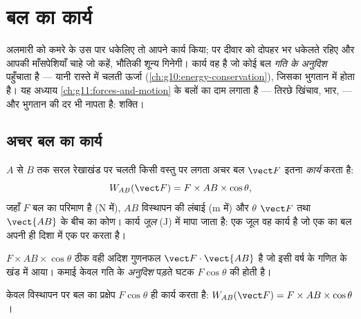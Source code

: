 \chapter{बल का कार्य}\label{ch:g11:work-of-force}

अलमारी को कमरे के उस पार धकेलिए तो आपने कार्य किया; पर दीवार को दोपहर भर
धकेलते रहिए और आपकी माँसपेशियाँ चाहे जो कहें, भौतिकी शून्य गिनेगी।
कार्य वह है जो कोई बल \emph{गति के अनुदिश} पहुँचाता है ---
यानी रास्ते में चलती ऊर्जा (\cref{ch:g10:energy-conservation}), जिसका भुगतान  में होता
है। यह अध्याय \cref{ch:g11:forces-and-motion} के बलों का दाम लगाता है --- तिरछे खिंचाव,
भार,  --- और भुगतान की दर भी नापता है: शक्ति।

\section{अचर बल का कार्य}

\begin{definition}[अचर बल का कार्य]\label{def:g11:work-of-force:work}
$A$ से $B$ तक सरल रेखाखंड पर चलती किसी वस्तु पर लगता अचर बल
$\vect F$ इतना \emph{कार्य} करता है:
\[
W_{AB}(\vect F) = F \times AB \times \cos\theta ,
\]
जहाँ $F$ बल का परिमाण है (\unit{N} में), $AB$ विस्थापन की लंबाई
(\unit{m} में) और $\theta$ $\vect F$ तथा $\vect{AB}$ के बीच का कोण। कार्य
\emph{जूल} (\unit{J}) में मापा जाता है: एक जूल वह कार्य है जो
एक  का बल अपनी ही दिशा में एक  पर करता
है।
\end{definition}

\begin{remark}\label{rem:g11:work-of-force:scal}
$F \times AB \times \cos\theta$ ठीक वही अदिश गुणनफल $\vect F \cdot \vect{AB}$ है जो इसी वर्ष के गणित के खंड में आया।
कमाई केवल गति के \emph{अनुदिश} पड़ते घटक $F\cos\theta$ की होती है।
\end{remark}

\begin{omfigure}

{\small केवल विस्थापन पर बल का प्रक्षेप $F\cos\theta$ ही
कार्य करता है: $W_{AB}(\vect F) = F \times AB \times \cos\theta$।}
\end{omfigure}

